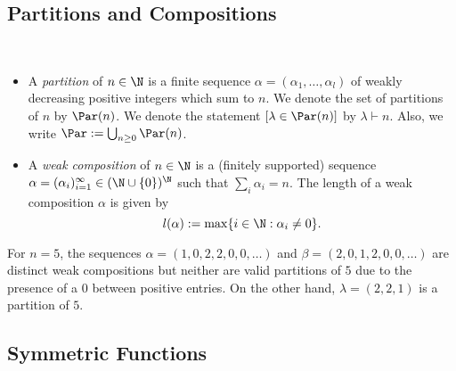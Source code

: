 \documentclass[12pt]{article}
\begin{document}
\subsection{Partitions and Compositions}
\begin{definition}\label{def:comp}\ 
  \begin{itemize}
    \item A \textit{partition} of $ n\in \N $ is a finite sequence $ \alpha=(\alpha_{1},\ldots, \alpha_{l}) $ of weakly decreasing positive integers which sum to $ n $. We denote the set of partitions of $ n $ by $ \Par(n) $. We denote the statement $ [\lambda\in \Par(n)] $ by $ \lambda\vdash n $. Also, we write $ \Par:=\bigcup_{n\geq0}\Par(n) $.
    \item A \textit{weak composition} of $ n\in \N $ is a (finitely supported) sequence $\alpha=(\alpha_{i})_{i=1}^{\infty}\in (\N\cup\{0\})^{\N}$ such that $ \sum_{i} \alpha_{i} = n $. The length of a weak composition $ \alpha $ is given by
  \[
    l(\alpha) :=\max\{i\in \N: \alpha_{i}\neq 0\}.
  \]
  \end{itemize}

  
\end{definition}

\begin{example}
  For $ n=5 $, the sequences $ \alpha=(1, 0, 2, 2, 0, 0, \ldots) $ and $ \beta=(2,0,1,2,0,0,\ldots) $ are distinct  weak compositions but neither are valid partitions of $ 5 $ due to the presence of a $ 0 $ between positive entries. On the other hand, $ \lambda = (2,2,1) $ is a partition of $ 5 $.
\end{example}

\subsection{Symmetric Functions}
\end{document}
